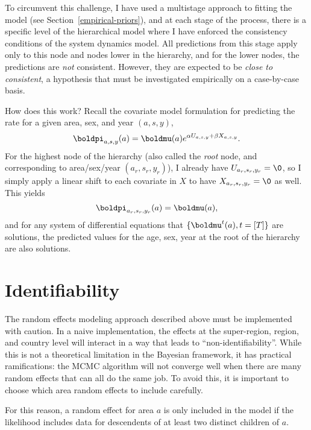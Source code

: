 To circumvent this challenge, I have used a multistage approach to
fitting the model (see Section~\ref{empirical-priors}), and at each
stage of the process, there is a specific level of the hierarchical
model where I have enforced the consistency conditions of the system
dynamics model.  All predictions from this stage apply only to this
node and nodes lower in the hierarchy, and for the lower nodes, the
predictions are \emph{not} consistent.  However, they are expected to
be \emph{close to consistent}, a hypothesis that must be investigated
empirically on a case-by-case basis.

How does this work?  Recall the covariate model formulation for
predicting the rate for a given area, sex, and year $(a,s,y)$,
\[
\boldpi_{a,s,y}(a) = \boldmu(a)e^{\alpha U_{a,s,y} + \beta X_{a,s,y}}.
\]
For the highest node of the hierarchy (also called the \emph{root}
node, and corresponding to area/sex/year $(a_r, s_r, y_r)$), I already
have $U_{a_r,s_r,y_r} = \0$, so I simply apply a linear shift to each
covariate in $X$ to have $X_{{a_r},{s_r},{y_r}} = \0$ as well.  This
yields
\[
\boldpi_{a_r,s_r,y_r}(a) = \boldmu(a),
\]
and for any system of differential equations that $\{\boldmu^t(a),
t=[T]\}$ are solutions, the predicted values for the age, sex, year at
the root of the hierarchy are also solutions.


\section{Identifiability}
The random effects modeling approach described above must be
implemented with caution.  In a naive implementation, the effects at
the super-region, region, and country level will interact in a way
that leads to ``non-identifiability''.  While this is not a
theoretical limitation in the Bayesian framework, it has practical
ramifications:  the MCMC algorithm will not converge well when there
are many random effects that can all do the same job.  To avoid this,
it is important to choose which area random effects to include
carefully.

For this reason, a random effect for area $a$ is only included in the model if
the likelihood includes data for descendents of at least two distinct
children of $a$.

